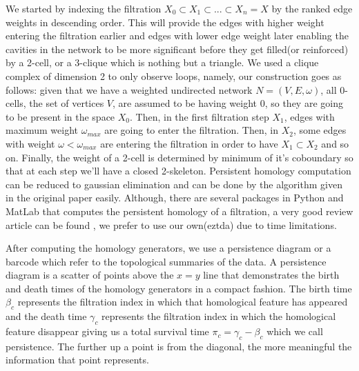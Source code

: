 \documentclass[9pt,twocolumn,twoside,lineno]{pnas-new}
\begin{document}
We started by indexing the filtration $X_{0}\subset X_{1}\subset ...\subset X_{n}=X$ by the ranked edge weights in descending order. This will provide the edges with higher weight entering the filtration earlier and edges with lower edge weight later enabling the cavities in the network to be more significant before they get filled(or reinforced) by a 2-cell, or a 3-clique which is nothing but a triangle. We used a clique complex of dimension 2 to only observe loops, namely, our construction goes as follows: given that we have a weighted undirected network $N=(V,E,\omega)$, all 0-cells, the set of vertices $V$, are assumed to be having weight $0$, so they are going to be present in the space $X_{0}$. Then, in the first filtration step $X_{1}$, edges with maximum weight $\omega_{max}$ are going to enter the filtration. Then, in $X_{2}$, some edges with weight $\omega<\omega_{max}$ are entering the filtration in order to have $X_{1}\subset X_{2}$ and so on. Finally, the weight of a 2-cell is determined by minimum of it's coboundary so that at each step we'll have a closed 2-skeleton. Persistent homology computation can be reduced to gaussian elimination and can be done by the algorithm given in the original paper\cite{zomorodian} easily. Although, there are several packages in Python and MatLab that computes the persistent homology of a filtration, a very good review article can be found \cite{roadmap}, we prefer to use our own(eztda) due to time limitations.

After computing the homology generators, we use a persistence diagram or a barcode \cite{barcode} which refer to the topological summaries of the data. A persistence diagram is a scatter of points above the $x=y$ line that demonstrates the birth and death times of the homology generators in a compact fashion. The birth time $\beta_{c}$ represents the filtration index in which that homological feature has appeared and the death time $\gamma_{c}$ represents the filtration index in which the homological feature disappear giving us a total survival time $\pi_{c}=\gamma_{c}-\beta_{c}$ which we call persistence.  The further up a point is from the diagonal, the more meaningful the information that point represents.
\end{document}
